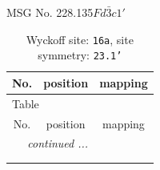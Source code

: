 \documentclass[fleqn,8pt]{jsarticle}
\begin{document}
\setcounter{MaxMatrixCols}{32}

\renewcommand{\tablename}{Table~}
\renewcommand{\figurename}{Figure~}
\begin{center}
\LARGE
MSG No. 228.135\quad$Fd\bar{3}c1'$
\end{center}
\renewcommand{\arraystretch}{1.2}
\begin{longtable}{ccc}
\caption{Wyckoff site: {\tt 16a}, site symmetry: {\tt 23.1'}}
 \\
 \hline \hline
No. & position & mapping \\ \hline \endfirsthead

\multicolumn{2}{l}{\tablename\ \thetable{}} \\
 \hline \hline
No. & position & mapping \\ \hline \endhead

 \hline \hline
\multicolumn{2}{r}{\footnotesize\it continued ...} \\ \endfoot

 \hline \hline
\multicolumn{2}{r}{} \\ \endlastfoot


\end{longtable}
\end{document}
